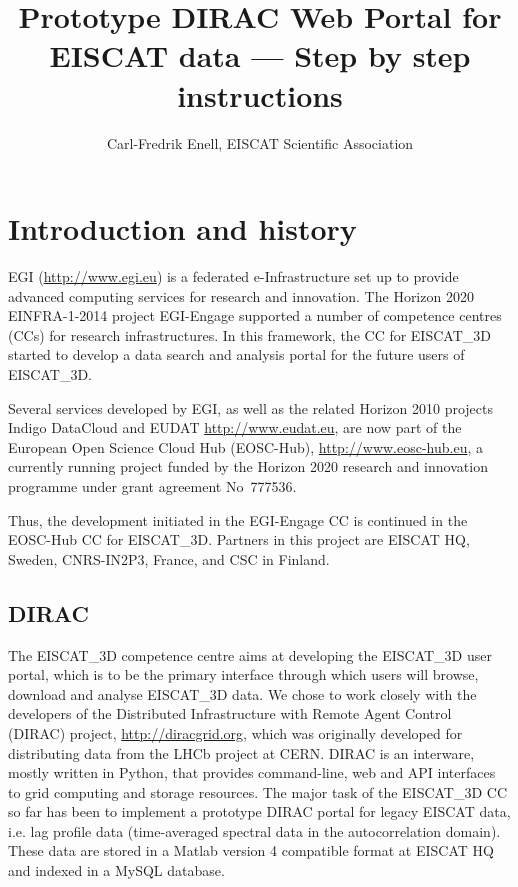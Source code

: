 \documentclass[a4paper]{article}
\title{Prototype DIRAC Web Portal for EISCAT data --- Step by step instructions}
\author{Carl-Fredrik Enell, EISCAT Scientific Association}
\newcommand{\etd}{EISCAT\_3D}
\begin{document}
\maketitle{}

\section{Introduction and history}
\label{sec:intro}

EGI (\url{http://www.egi.eu}) is a federated e-Infrastructure set up
to provide advanced computing services for research and innovation.
The Horizon 2020 EINFRA-1-2014 project EGI-Engage supported a number
of competence centres (CCs) for research infrastructures. In this
framework, the CC for \etd{} started to develop a data search and
analysis portal for the future users of \etd{}.

Several services developed by EGI, as well as the related Horizon 2010
projects Indigo DataCloud and EUDAT \url{http://www.eudat.eu}, are now
part of the European Open Science Cloud Hub (EOSC-Hub),
\url{http://www.eosc-hub.eu}, a currently running project funded by
the Horizon 2020 research and innovation programme under grant
agreement No~777536.

Thus, the development initiated in the EGI-Engage CC is continued in
the EOSC-Hub CC for \etd{}. Partners in this project are EISCAT HQ,
Sweden, CNRS-IN2P3, France, and CSC in Finland.

\subsection{DIRAC}
\label{sec:dirac}

The \etd{} competence centre aims at developing the \etd{} user
portal, which is to be the primary interface through which users will
browse, download and analyse \etd{} data.  We chose to work closely
with the developers of the Distributed Infrastructure with Remote
Agent Control (DIRAC) project, \url{http://diracgrid.org}, which was
originally developed for distributing data from the LHCb project at
CERN. DIRAC is an interware, mostly written in Python, that provides
command-line, web and API interfaces to grid computing and storage
resources. The major task of the \etd{} CC so far has been to
implement a prototype DIRAC portal for legacy EISCAT data, i.e. lag
profile data (time-averaged spectral data in the autocorrelation
domain). These data are stored in a Matlab version 4 compatible format
at EISCAT HQ and indexed in a MySQL database.
\end{document}
